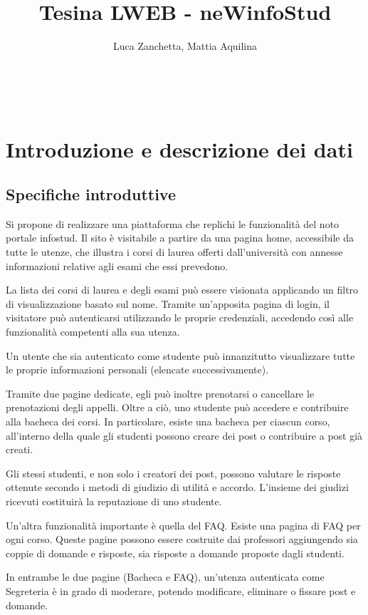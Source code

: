 \documentclass [a4paper,11pt]{book}
\begin{document}
\author{Luca Zanchetta, Mattia Aquilina}
\title{Tesina LWEB - neWinfoStud}
\maketitle
\
\tableofcontents

\chapter{Introduzione e descrizione dei dati}

\section{Specifiche introduttive}

Si propone di realizzare una piattaforma che replichi le funzionalità del noto portale infostud. Il sito è visitabile a partire da una pagina home, accessibile da tutte le utenze, che illustra i corsi di laurea offerti dall’università con annesse informazioni relative agli esami che essi prevedono.
  
La lista dei corsi di laurea e degli esami può essere visionata applicando un filtro di visualizzazione basato sul nome.
Tramite un’apposita pagina di login, il visitatore può autenticarsi utilizzando le proprie credenziali, accedendo così alle funzionalità competenti alla sua utenza.

Un utente che sia autenticato come studente può innanzitutto visualizzare tutte le proprie informazioni personali (elencate successivamente). 

Tramite due pagine dedicate, egli può inoltre prenotarsi o cancellare le prenotazioni degli appelli. Oltre a ciò, uno studente può accedere e contribuire alla bacheca dei corsi. In particolare, esiste una bacheca per ciascun corso, all’interno della quale gli studenti possono creare dei post o contribuire a post già creati. 

Gli stessi studenti, e non solo i creatori dei post, possono valutare le risposte ottenute secondo i metodi di giudizio di utilità e accordo. L’insieme dei giudizi ricevuti costituirà la reputazione di uno studente.

Un’altra funzionalità importante è quella del FAQ. Esiste una pagina di FAQ per ogni corso. Queste pagine possono essere costruite dai professori aggiungendo sia coppie di domande e risposte, sia risposte a domande proposte dagli studenti.

In entrambe le due pagine (Bacheca e FAQ), un’utenza autenticata come Segreteria è in grado di moderare, potendo modificare, eliminare o fissare post e domande.
\end{document}
